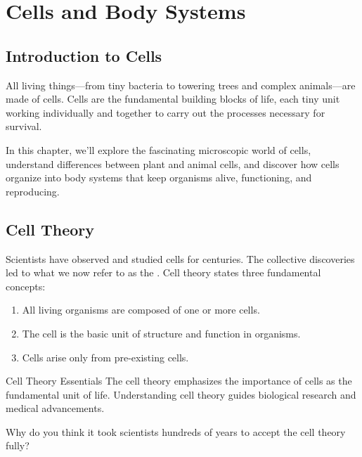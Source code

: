 \chapter{Cells and Body Systems}

\section{Introduction to Cells}

All living things—from tiny bacteria to towering trees and complex animals—are made of cells. Cells are the fundamental building blocks of life, each tiny unit working individually and together to carry out the processes necessary for survival.


In this chapter, we'll explore the fascinating microscopic world of cells, understand differences between plant and animal cells, and discover how cells organize into body systems that keep organisms alive, functioning, and reproducing.

\section{Cell Theory}

Scientists have observed and studied cells for centuries. The collective discoveries led to what we now refer to as the . Cell theory states three fundamental concepts:

\begin{enumerate}
    \item All living organisms are composed of one or more cells.
    \item The cell is the basic unit of structure and function in organisms.
    \item Cells arise only from pre-existing cells.
\end{enumerate}

\begin{keyconcept}{Cell Theory Essentials}
The cell theory emphasizes the importance of cells as the fundamental unit of life. Understanding cell theory guides biological research and medical advancements.
\end{keyconcept}

\begin{stopandthink}
Why do you think it took scientists hundreds of years to accept the cell theory fully?
\end{stopandthink}

